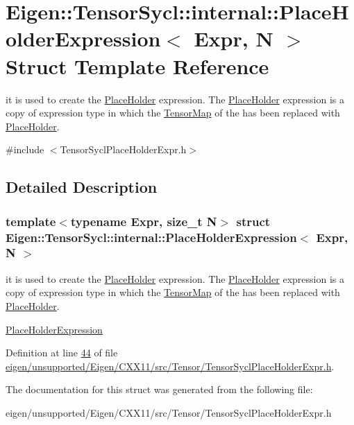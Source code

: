 \hypertarget{struct_eigen_1_1_tensor_sycl_1_1internal_1_1_place_holder_expression}{}\section{Eigen\+:\+:Tensor\+Sycl\+:\+:internal\+:\+:Place\+Holder\+Expression$<$ Expr, N $>$ Struct Template Reference}
\label{struct_eigen_1_1_tensor_sycl_1_1internal_1_1_place_holder_expression}


it is used to create the \hyperlink{struct_eigen_1_1_tensor_sycl_1_1internal_1_1_place_holder}{Place\+Holder} expression. The \hyperlink{struct_eigen_1_1_tensor_sycl_1_1internal_1_1_place_holder}{Place\+Holder} expression is a copy of expression type in which the \hyperlink{class_eigen_1_1_tensor_map}{Tensor\+Map} of the has been replaced with \hyperlink{struct_eigen_1_1_tensor_sycl_1_1internal_1_1_place_holder}{Place\+Holder}.  




{\ttfamily \#include $<$Tensor\+Sycl\+Place\+Holder\+Expr.\+h$>$}



\subsection{Detailed Description}
\subsubsection*{template$<$typename Expr, size\+\_\+t N$>$\newline
struct Eigen\+::\+Tensor\+Sycl\+::internal\+::\+Place\+Holder\+Expression$<$ Expr, N $>$}

it is used to create the \hyperlink{struct_eigen_1_1_tensor_sycl_1_1internal_1_1_place_holder}{Place\+Holder} expression. The \hyperlink{struct_eigen_1_1_tensor_sycl_1_1internal_1_1_place_holder}{Place\+Holder} expression is a copy of expression type in which the \hyperlink{class_eigen_1_1_tensor_map}{Tensor\+Map} of the has been replaced with \hyperlink{struct_eigen_1_1_tensor_sycl_1_1internal_1_1_place_holder}{Place\+Holder}. 

\hyperlink{struct_eigen_1_1_tensor_sycl_1_1internal_1_1_place_holder_expression}{Place\+Holder\+Expression} 

Definition at line \hyperlink{eigen_2unsupported_2_eigen_2_c_x_x11_2src_2_tensor_2_tensor_sycl_place_holder_expr_8h_source_l00044}{44} of file \hyperlink{eigen_2unsupported_2_eigen_2_c_x_x11_2src_2_tensor_2_tensor_sycl_place_holder_expr_8h_source}{eigen/unsupported/\+Eigen/\+C\+X\+X11/src/\+Tensor/\+Tensor\+Sycl\+Place\+Holder\+Expr.\+h}.



The documentation for this struct was generated from the following file\+:\begin{DoxyCompactItemize}
\item 
eigen/unsupported/\+Eigen/\+C\+X\+X11/src/\+Tensor/\+Tensor\+Sycl\+Place\+Holder\+Expr.\+h\end{DoxyCompactItemize}
